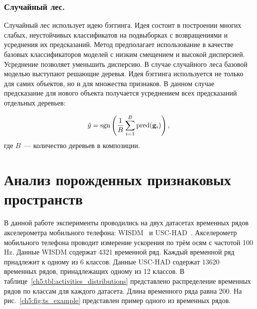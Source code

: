 \subsubsection{Случайный лес.}
Случайный лес использует идею бэггинга. 
Идея состоит в построении многих слабых, неустойчивых классификатов на подвыборках с возвращениями и усреднения их предсказаний.
Метод предполагает использование в качестве базовых классификаторов моделей с низким смещением и высокой дисперсией. 
Усреднение позволяет уменьшить дисперсию.
В случае случайного леса базовой моделью выступают решающие деревья. Идея бэггинга используется не только для самих объектов, но и для множества признаков.
В данном случае предсказание для нового объекта получается усреднением всех предсказаний отдельных деревьев:

\begin{equation*}
\hat{y} = \operatorname{\mathop{sgn}} \left(\frac{1}{B} \sum_{i=1}^{B} \text{pred}(\mathbf{g}_i) \right),
\end{equation*}
где $B$~--- количество деревьев в композиции.


\section{Анализ порожденных признаковых пространств}
В данной работе эксперименты проводились на двух датасетах временных рядов акселерометра мобильного телефона: WISDM~\cite{wisdm} и USC-HAD~\cite{usc}. 
Акселерометр мобильного телефона проводит измерение ускорения по трём осям с частотой 100 Hz.
Данные WISDM содержат 4321 временной ряд.
Каждый временной ряд прнадлежит к одному из 6 классов. 
Данные USC-HAD содержат 13620 временных рядов, принадлежащих одному из 12 классов.  
В таблице~\ref{ch5:tbl:activities_distributions} представлено распределение временных рядов по классам для каждого датасета.
Длина временного ряда равна 200.
На рис.~\ref{ch5:fig:ts_example} представлен пример одного из временных рядов.

